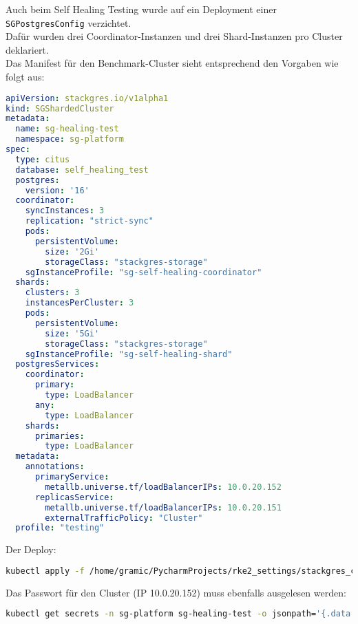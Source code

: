Auch beim Self Healing Testing wurde auf ein Deployment einer \texttt{SGPostgresConfig} verzichtet.\\
Dafür wurden drei Coordinator-Instanzen und drei Shard-Instanzen pro Cluster deklariert.\\
Das Manifest für den Benchmark-Cluster sieht entsprechend den Vorgaben wie folgt aus:
\lstset{style=gra_codestyle}
\begin{lstlisting}[language=yaml, caption=StackGres-Citus - Self Healing Testing - SGShardedCluster,captionpos=b,label={lst:SGShardedCluster_self_healing_test.yaml},breaklines=true]
apiVersion: stackgres.io/v1alpha1
kind: SGShardedCluster
metadata:
  name: sg-healing-test
  namespace: sg-platform
spec:
  type: citus
  database: self_healing_test
  postgres:
    version: '16'
  coordinator:
    syncInstances: 3
    replication: "strict-sync"
    pods:
      persistentVolume:
        size: '2Gi'
        storageClass: "stackgres-storage"
    sgInstanceProfile: "sg-self-healing-coordinator"
  shards:
    clusters: 3
    instancesPerCluster: 3
    pods:
      persistentVolume:
        size: '5Gi'
        storageClass: "stackgres-storage"
    sgInstanceProfile: "sg-self-healing-shard"
  postgresServices:
    coordinator:
      primary:
        type: LoadBalancer
      any:
        type: LoadBalancer
    shards:
      primaries:
        type: LoadBalancer
  metadata:
    annotations:
      primaryService:
        metallb.universe.tf/loadBalancerIPs: 10.0.20.152
      replicasService:
        metallb.universe.tf/loadBalancerIPs: 10.0.20.151
        externalTrafficPolicy: "Cluster"
  profile: "testing"
\end{lstlisting}
Der Deploy:
\lstset{style=gra_codestyle}
\begin{lstlisting}[language=bash, caption=StackGres-Citus - Self Healing Testing - Cluster Deploy,captionpos=b,label={lst:stackgres_citus-self-healing-test-deploy-cluster},breaklines=true]
kubectl apply -f /home/gramic/PycharmProjects/rke2_settings/stackgres_citus/stackgres_citus/SGShardedCluster_self_healing_test.yaml
\end{lstlisting}

Das Passwort für den Cluster (IP 10.0.20.152) muss ebenfalls ausgelesen werden:
\lstset{style=gra_codestyle}
\begin{lstlisting}[language=bash, caption=StackGres-Citus - Self Healing Testing DB Passwort,captionpos=b,label={lst:stackgres_citus-get-self-healing-testing-cluster-passwd},breaklines=true]
kubectl get secrets -n sg-platform sg-healing-test -o jsonpath='{.data.superuser-password}' | base64 -d
\end{lstlisting}

